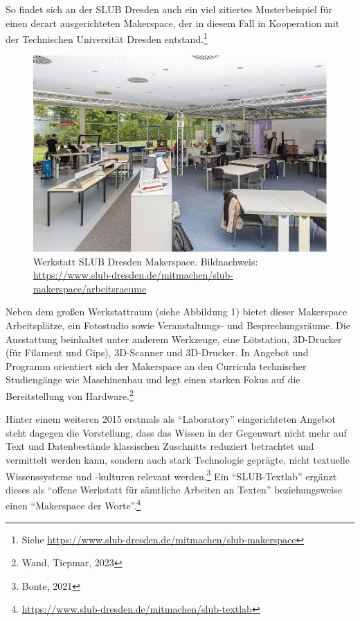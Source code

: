 \documentclass[a4paper,
fontsize=11pt,
oneside,
numbers=noperiodatend,
parskip=half-,
bibliography=totoc,
final
]{scrartcl}
\begin{document}
So findet sich an der SLUB Dresden auch ein viel zitiertes
Musterbeispiel für einen derart ausgerichteten Makerspace, der in diesem
Fall in Kooperation mit der Technischen Universität Dresden
entstand.\footnote{Siehe
  \url{https://www.slub-dresden.de/mitmachen/slub-makerspace}}

\begin{figure}
\centering
\includegraphics{abbildung_2.png}
\caption{Werkstatt SLUB Dresden Makerspace. Bildnachweis:
\url{https://www.slub-dresden.de/mitmachen/slub-makerspace/arbeitsraeume}}
\end{figure}

Neben dem großen Werkstattraum (siehe Abbildung 1) bietet dieser
Makerspace Arbeitsplätze, ein Fotostudio sowie Veranstaltungs- und
Besprechungsräume. Die Ausstattung beinhaltet unter anderem Werkzeuge,
eine Lötstation, 3D-Drucker (für Filament und Gips), 3D-Scanner und
3D-Drucker. In Angebot und Programm orientiert sich der Makerspace an
den Curricula technischer Studiengänge wie Maschinenbau und legt einen
starken Fokus auf die Bereitstellung von Hardware.\footnote{Wand,
  Tiepmar, 2023}

Hinter einem weiteren 2015 erstmals als \enquote{Laboratory}
eingerichteten Angebot steht dagegen die Vorstellung, dass das Wissen in
der Gegenwart nicht mehr auf Text und Datenbestände klassischen
Zuschnitts reduziert betrachtet und vermittelt werden kann, sondern auch
stark Technologie geprägte, nicht textuelle Wissenssysteme und -kulturen
relevant werden.\footnote{Bonte, 2021} Ein \enquote{SLUB-Textlab}
ergänzt dieses als \enquote{offene Werkstatt für sämtliche Arbeiten an
Texten} beziehungsweise einen \enquote{Makerspace der Worte}.\footnote{\url{https://www.slub-dresden.de/mitmachen/slub-textlab}}
\end{document}

